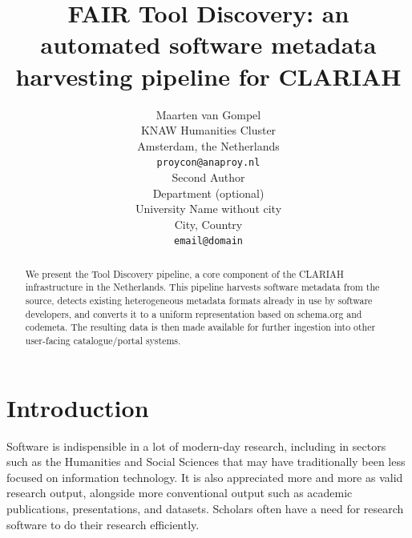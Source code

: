 \documentclass[a4paper,11pt]{article}
\title{FAIR Tool Discovery: an automated software metadata harvesting pipeline for CLARIAH}
\author{Maarten van Gompel \\
  KNAW Humanities Cluster \\
  Amsterdam, the Netherlands \\
  {\tt proycon@anaproy.nl} \\\And %
  Second Author \\
  Department (optional)\\
  University Name without city \\
  City, Country \\
 {\tt email@domain} \\
}
\date{}
\begin{document}
\maketitle
\begin{abstract}
  We present the Tool Discovery pipeline, a core component of the CLARIAH
    infrastructure in the Netherlands. This pipeline harvests software metadata
    from the source, detects existing heterogeneous metadata formats already in
    use by software developers, and converts it to a uniform representation
    based on schema.org and codemeta. The resulting data is then made available
    for further ingestion into other user-facing catalogue/portal systems. 
\end{abstract}

\section{Introduction} \label{intro}

%

Software is indispensible in a lot of modern-day research, including in sectors
such as the Humanities and Social Sciences that may have traditionally been
less focused on information technology. It is also appreciated more and more as
valid research output, alongside more conventional output such as academic
publications, presentations, and datasets. Scholars often have a need for
research software to do their research efficiently.
\end{document}
